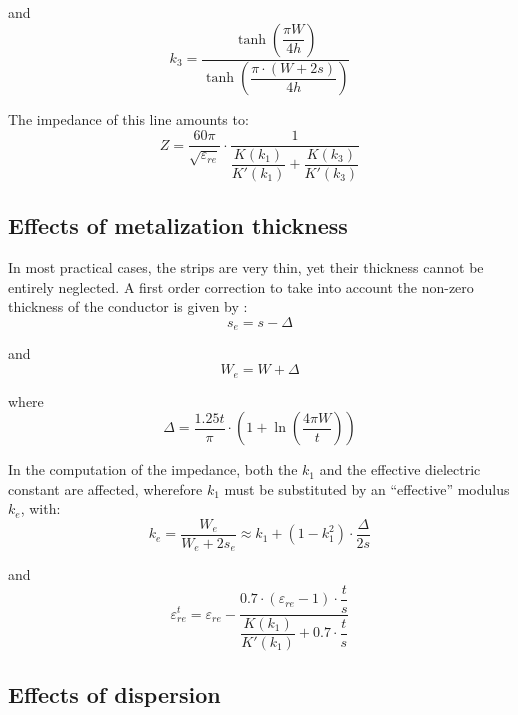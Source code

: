 and
\begin{equation}
k_3 = \dfrac{\tanh\left(\dfrac{\pi W}{4h}\right)}{\tanh\left(\dfrac{\pi\cdot\left(W+2s\right)}{4h}\right)}
\end{equation}

The impedance of this line amounts to:
\begin{equation}
Z=\dfrac{60\pi}{\sqrt{\varepsilon_{re}}}\cdot\dfrac{1}{\dfrac{K(k_1)}{K'(k_1)}+\dfrac{K(k_3)}{K'(k_3)}}
\end{equation}

\subsection{Effects of metalization thickness}

In most practical cases, the strips are very thin, yet their thickness
cannot be entirely neglected.  A first order correction to take into
account the non-zero thickness of the conductor is given by
\cite{Gupta1}:
\begin{equation}
s_e = s - \Delta
\end{equation}

and
\begin{equation}
W_e = W + \Delta
\end{equation}

where
\begin{equation}
\Delta = \dfrac{1.25t}{\pi}\cdot\left(1 + \ln\left(\dfrac{4 \pi W}{t}\right)\right)
\end{equation}

In the computation of the impedance, both the $k_1$ and the effective
dielectric constant are affected, wherefore $k_1$ must be substituted
by an ``effective'' modulus $k_e$, with:
\begin{equation}
k_e = \dfrac {W_e}{W_e + 2 s_e} \approx k_1 + \left(1 - k_1^2\right)\cdot \dfrac{\Delta}{2s}
\end{equation}

and
\begin{equation}
\varepsilon_{re}^{t} = \varepsilon_{re} - \dfrac{0.7\cdot\left(\varepsilon_{re} - 1\right)\cdot\dfrac{t}{s}}{\dfrac{K(k_1)}{K'(k_1)} + 0.7\cdot \dfrac{t}{s}}
\end{equation}

\subsection{Effects of dispersion}

